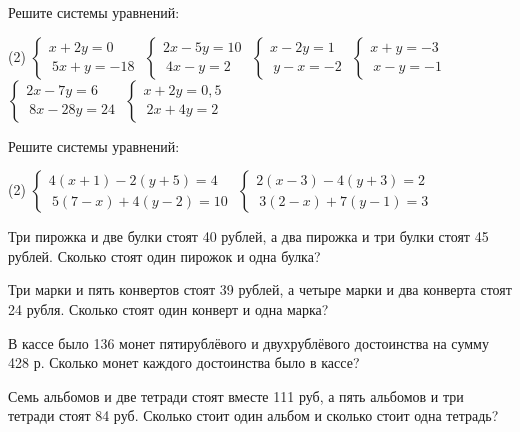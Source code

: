 \begin{class}[number=6]
	\begin{listofex}
		\item Решите системы уравнений:
		\begin{tasks}(2)
			\task \( \begin{cases}
				x+2y=0\\\
				5x+y=-18
			\end{cases} \)
			\task \( \begin{cases}
				2x-5y=10\\\
				4x-y=2
			\end{cases} \)
			\task \( \begin{cases}
				x-2y=1\\\
				y-x=-2
			\end{cases} \)
			\task \( \begin{cases}
				x+y=-3\\\
				x-y=-1
			\end{cases} \)
			\task \( \begin{cases}
				2x-7y=6\\\
				8x-28y=24
			\end{cases} \)
			\task \( \begin{cases}
				x+2y=0,5\\\
				2x+4y=2
			\end{cases} \)
		\end{tasks}
		\item Решите системы уравнений:
		\begin{tasks}(2)
			\task \( \begin{cases}
				4(x+1)-2(y+5)=4\\\ 5(7-x)+4(y-2)=10
			\end{cases} \)
			\task \( \begin{cases}
				2(x-3)-4(y+3)=2\\\ 3(2-x)+7(y-1)=3
			\end{cases} \)
		\end{tasks}
		\item Три пирожка и две булки стоят 40 рублей, а два пирожка и три булки стоят 45 рублей. Сколько стоят один пирожок и одна булка?
		\item Три марки и пять конвертов стоят 39 рублей, а четыре марки и два конверта стоят 24 рубля. Сколько стоят один конверт и одна марка?
		\item  В кассе было 136 монет пятирублёвого и  двухрублёвого достоинства на сумму 428 р. Сколько монет каждого достоинства было в кассе?
		\item Семь альбомов и две тетради стоят вместе 111 руб, а пять альбомов и три тетради стоят 84 руб. Сколько стоит один альбом и сколько стоит одна тетрадь?
		
		
	\end{listofex}
\end{class}

